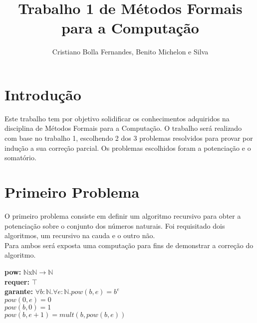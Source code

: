 \documentclass{article}
\title{Trabalho 1 de Métodos Formais para a Computação}
\author{Cristiano Bolla Fernandes, Benito Michelon e Silva}
\begin{document}
\maketitle

\section{Introdução}
Este trabalho tem por objetivo solidificar os conhecimentos adquiridos na disciplina de Métodos Formais para a Computação.
O trabalho será realizado com base no trabalho 1, escolhendo 2 dos 3 problemas resolvidos para provar por indução a sua correção parcial.
Os problemas escolhidos foram a potenciação e o somatório.

\section{Primeiro Problema}
O primeiro problema consiste em definir um algoritmo recursivo para obter a potenciação sobre o conjunto dos números naturais.
Foi requisitado dois algoritmos, um recursivo na cauda e o outro não.\\
Para ambos será exposta uma computação para fins de demonstrar a correção do algoritmo.

\noindent \textbf{pow:} $\mathbb{N}$x$\mathbb{N}$$ \rightarrow \mathbb{N}$\\
\textbf{requer:} $\top$\\
\textbf{garante:} $\forall b:\mathbb{N}. \forall e:\mathbb{N}. pow(b, e) = b^e$\\
$pow(0, e) = 0$ \\
$pow(b, 0) = 1$ \\
$pow(b, e+1) = mult(b, pow(b, e))$ \\
\end{document}
